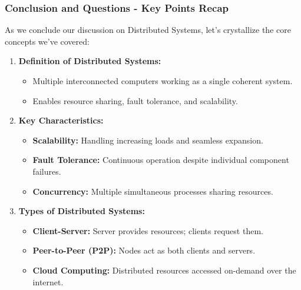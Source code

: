 \documentclass[aspectratio=169]{beamer}
\begin{document}
\begin{frame}[fragile]
  \frametitle{Conclusion and Questions - Key Points Recap}
  As we conclude our discussion on Distributed Systems, let’s crystallize the core concepts we’ve covered:

  \begin{enumerate}
    \item \textbf{Definition of Distributed Systems:}
    \begin{itemize}
      \item Multiple interconnected computers working as a single coherent system.
      \item Enables resource sharing, fault tolerance, and scalability.
    \end{itemize}

    \item \textbf{Key Characteristics:}
    \begin{itemize}
      \item \textbf{Scalability:} Handling increasing loads and seamless expansion.
      \item \textbf{Fault Tolerance:} Continuous operation despite individual component failures.
      \item \textbf{Concurrency:} Multiple simultaneous processes sharing resources.
    \end{itemize}
  
    \item \textbf{Types of Distributed Systems:}
    \begin{itemize}
      \item \textbf{Client-Server:} Server provides resources; clients request them.
      \item \textbf{Peer-to-Peer (P2P):} Nodes act as both clients and servers.
      \item \textbf{Cloud Computing:} Distributed resources accessed on-demand over the internet.
    \end{itemize}
  \end{enumerate}
\end{frame}
\end{document}
